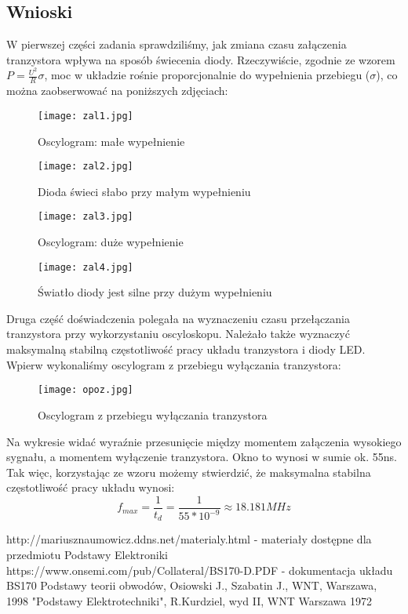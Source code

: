 \documentclass[polish,a4paper]{article}
\begin{document}
\subsection{Wnioski}
W pierwszej części zadania sprawdziliśmy, jak zmiana czasu załączenia tranzystora wpływa na sposób świecenia diody. Rzeczywiście, zgodnie ze wzorem $P = \frac{U^2}{R}\sigma$, moc w układzie rośnie proporcjonalnie do wypełnienia przebiegu ($\sigma$), co można zaobserwować na poniższych zdjęciach:
\begin{figure}[H]
\centering
\texttt{[image: zal1.jpg]}
\caption{Oscylogram: małe wypełnienie}
\end{figure}
\begin{figure}[H]
\centering
\texttt{[image: zal2.jpg]}
\caption{Dioda świeci słabo przy małym wypełnieniu}
\end{figure}
\begin{figure}[H]
\centering
\texttt{[image: zal3.jpg]}
\caption{Oscylogram: duże wypełnienie}
\end{figure}
\begin{figure}[H]
\centering
\texttt{[image: zal4.jpg]}
\caption{Światło diody jest silne przy dużym wypełnieniu}
\end{figure}

Druga część doświadczenia polegała na wyznaczeniu czasu przełączania tranzystora przy wykorzystaniu oscyloskopu. Należało także wyznaczyć maksymalną stabilną częstotliwość pracy układu tranzystora i diody LED.
Wpierw wykonaliśmy oscylogram z przebiegu wyłączania tranzystora:
\begin{figure}[H]
\centering
\texttt{[image: opoz.jpg]}
\caption{Oscylogram z przebiegu wyłączania tranzystora}
\end{figure}
Na wykresie widać wyraźnie przesunięcie między momentem załączenia wysokiego sygnału, a momentem wyłączenie tranzystora. Okno to wynosi w sumie ok. 55ns. Tak więc, korzystając ze wzoru\cite{naum} możemy stwierdzić, że maksymalna stabilna częstotliwość pracy układu wynosi:
$$f_{max} = \frac{1}{t_d} = \frac{1}{55*10^{-9}} \approx 18.181MHz$$


\begin{thebibliography}{3}
 http://mariusznaumowicz.ddns.net/materialy.html - materiały dostępne dla przedmiotu Podstawy Elektroniki
 https://www.onsemi.com/pub/Collateral/BS170-D.PDF - dokumentacja układu BS170
Podstawy teorii obwodów, Osiowski J., Szabatin J., WNT, Warszawa, 1998
"Podstawy Elektrotechniki", R.Kurdziel, wyd II, WNT Warszawa 1972
\end{thebibliography}

\newpage
\tableofcontents{}
\end{document}
